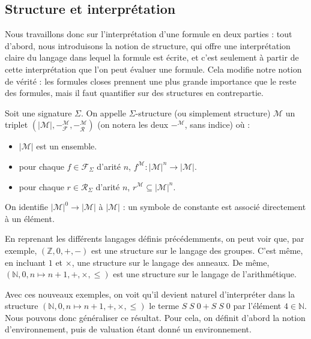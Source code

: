 \subsection{Structure et interprétation}

Nous travaillons donc sur l'interprétation d'une formule en deux parties : tout
d'abord, nous introduisons la notion de structure, qui offre une interprétation
claire du langage dans lequel la formule est écrite, et c'est seulement à partir
de cette interprétation que l'on peut évaluer une formule. Cela modifie notre
notion de vérité : les formules closes prennent une plus grande importance que
le reste des formules, mais il faut quantifier sur des structures en
contrepartie.

\begin{definition}[Structure]
  Soit une signature $\Sigma$. On appelle $\Sigma$-structure (ou simplement
  structure) $\mathcal M$ un triplet
  $(|\mathcal M|,-^{\mathcal M}_\mathcal F,-^{\mathcal M}_\mathcal R)$
  (on notera les deux $-^{\mathcal M}$, sans indice) où :
  \begin{itemize}
  \item $|\mathcal M|$ est un ensemble.
  \item pour chaque $f\in \mathcal F_\Sigma$ d'arité $n$,
    $f^{\mathcal M} : |\mathcal M|^n \to |\mathcal M|$.
  \item pour chaque $r\in\mathcal R_\Sigma$ d'arité $n$,
    $r^{\mathcal M} \subseteq |\mathcal M|^n$.
  \end{itemize}

  On identifie $|\mathcal M|^0 \to |\mathcal M|$ à $|\mathcal M|$ : un symbole
  de constante est associé directement à un élément.
\end{definition}

\begin{example}
  En reprenant les différents langages définis précédemments, on peut voir que,
  par exemple, $(\mathbb Z,0,+,-)$ est une structure sur le langage des groupes.
  C'est même, en incluant $1$ et $\times$, une structure sur le langage des
  anneaux. De même, $(\mathbb N,0,n\mapsto n + 1,+,\times,\leq)$ est une
  structure sur le langage de l'arithmétique.
\end{example}

Avec ces nouveaux exemples, on voit qu'il devient naturel d'interpréter dans la
structure $(\mathbb N,0,n\mapsto n+1,+,\times,\leq)$ le terme
$S\;S\;0 + S\;S\;0$
par l'élément $4\in\mathbb N$. Nous pouvons donc généraliser ce résultat. Pour
cela, on définit d'abord la notion d'environnement, puis de valuation étant
donné un environnement.

